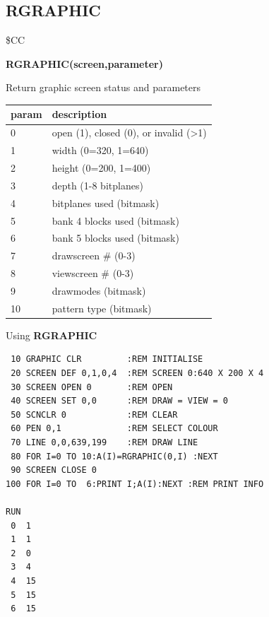 \subsection{RGRAPHIC}
\begin{description}[leftmargin=2cm,style=nextline]
\item [Token:] \$CC
\item [Format:] {\bf RGRAPHIC(screen,parameter)}
\item [Usage:]  Return graphic screen status and parameters

\ttfamily
{\setlength{\tabcolsep}{1mm}
\begin{tabular}{|l|l|}
\hline
 param  & description \\
\hline
 0 & open (1), closed (0), or invalid (>1)  \\
 1 & width  (0=320, 1=640)  \\
 2 & height (0=200, 1=400)  \\
 3 & depth (1-8 bitplanes)  \\
 4 & bitplanes used  (bitmask)  \\
 5 & bank 4 blocks used (bitmask)  \\
 6 & bank 5 blocks used (bitmask)  \\
 7 & drawscreen \# (0-3)  \\
 8 & viewscreen \# (0-3)  \\
 9 & drawmodes  (bitmask)  \\
10 & pattern type  (bitmask)  \\
\hline
\end{tabular}
}

\item [Example:] Using {\bf RGRAPHIC}

\begin{tcolorbox}[colback=black,coltext=white]
\verbatimfont{\codefont}
\begin{verbatim}
 10 GRAPHIC CLR         :REM INITIALISE
 20 SCREEN DEF 0,1,0,4  :REM SCREEN 0:640 X 200 X 4
 30 SCREEN OPEN 0       :REM OPEN
 40 SCREEN SET 0,0      :REM DRAW = VIEW = 0
 50 SCNCLR 0            :REM CLEAR
 60 PEN 0,1             :REM SELECT COLOUR
 70 LINE 0,0,639,199    :REM DRAW LINE
 80 FOR I=0 TO 10:A(I)=RGRAPHIC(0,I) :NEXT
 90 SCREEN CLOSE 0
100 FOR I=0 TO  6:PRINT I;A(I):NEXT :REM PRINT INFO

RUN
 0  1
 1  1
 2  0
 3  4
 4  15
 5  15
 6  15
\end{verbatim}
\end{tcolorbox}
\end{description}



